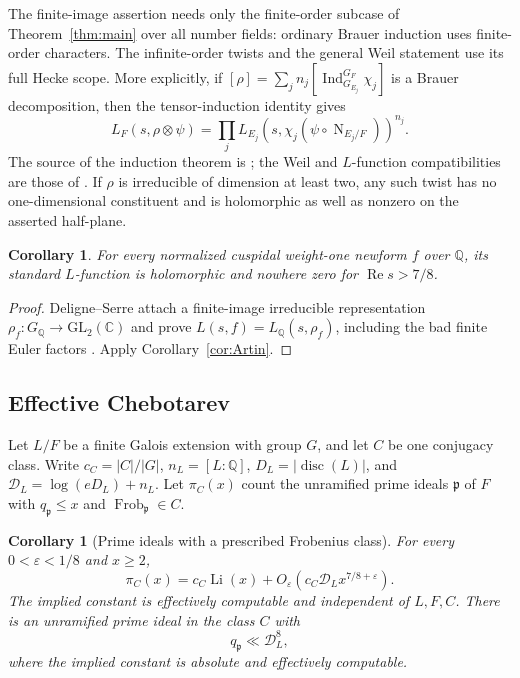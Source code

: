\documentclass[11pt,a4paper]{article}
\numberwithin{equation}{section}
\newtheorem{corollary}[theorem]{Corollary}
\theoremstyle{definition}
\theoremstyle{remark}
\newcommand{\eps}{\varepsilon}
\newcommand{\CC}{\mathbb C}
\newcommand{\QQ}{\mathbb Q}
\newcommand{\Rea}{\operatorname{Re}}
\newcommand{\Norm}{\operatorname{N}}
\begin{document}
The finite-image assertion needs only the finite-order subcase of
Theorem~\ref{thm:main} over all number fields: ordinary Brauer
induction uses finite-order characters.  The infinite-order twists
and the general Weil statement use its full Hecke scope.  More
explicitly, if
$[\rho]=\sum_j n_j[\operatorname{Ind}_{G_{E_j}}^{G_F}\chi_j]$
is a Brauer decomposition, then the tensor-induction identity gives
\begin{equation}\label{eq:Artin-Hecke-twist}
 L_F(s,\rho\otimes\psi)=
  \prod_j L_{E_j}\!\left(s,
       \chi_j(\psi\circ\Norm_{E_j/F})\right)^{n_j}.
\end{equation}
The source of the induction theorem is \cite{Brauer}; the Weil and
$L$-function compatibilities are those of
\cite[Lemma~2.3 and Chapter~20]{Langlands}.
  If $\rho$ is irreducible of dimension at
least two, any such twist has no one-dimensional constituent and
is holomorphic as well as nonzero on the asserted half-plane.

\begin{corollary}\label{cor:weight-one}
For every normalized cuspidal weight-one newform $f$ over $\QQ$,
its standard $L$-function is holomorphic and nowhere zero for
$\Rea s>7/8$.
\end{corollary}
\begin{proof}
Deligne--Serre attach a finite-image irreducible representation
$\rho_f:G_{\QQ}\to\mathrm{GL}_2(\CC)$ and prove
$L(s,f)=L_{\QQ}(s,\rho_f)$, including the bad finite Euler
factors \cite[Theorems~4.1 and~4.6]{DS}.  Apply
Corollary~\ref{cor:Artin}.
\end{proof}

\subsection{Effective Chebotarev}\label{subsec:chebotarev}

Let $L/F$ be a finite Galois extension with group $G$, and let $C$ be
one conjugacy class. Write $c_C=|C|/|G|$,
$n_L=[L:\QQ]$, $D_L=|\operatorname{disc}(L)|$, and
$\mathcal D_L=\log(eD_L)+n_L$. Let $\pi_C(x)$ count the unramified
prime ideals $\mathfrak p$ of $F$ with $q_{\mathfrak p}\le x$ and
$\operatorname{Frob}_{\mathfrak p}\in C$.

\begin{corollary}[Prime ideals with a prescribed Frobenius class]
\label{cor:chebotarev}
For every $0<\eps<1/8$ and $x\ge2$,
\begin{equation}\label{eq:chebotarev-count}
 \pi_C(x)=c_C\operatorname{Li}(x)
       +O_\eps\!\left(c_C\mathcal D_Lx^{7/8+\eps}\right).
\end{equation}
The implied constant is effectively computable and independent of
$L,F,C$. There is an unramified prime ideal in the class $C$ with
\begin{equation}\label{eq:chebotarev-least}
 q_{\mathfrak p}\ll\mathcal D_L^8,
\end{equation}
where the implied constant is absolute and effectively computable.
\end{corollary}
\end{document}
